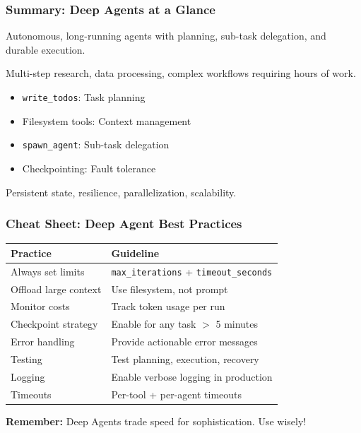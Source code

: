 \documentclass[aspectratio=169,11pt]{beamer}
\begin{document}
\begin{frame}[fragile]
\frametitle{Summary: Deep Agents at a Glance}

\begin{conceptbox}
Autonomous, long-running agents with planning, sub-task delegation, and durable execution.
\end{conceptbox}

\begin{conceptbox}
Multi-step research, data processing, complex workflows requiring hours of work.
\end{conceptbox}

\begin{conceptbox}
\begin{itemize}
    \setlength{\itemsep}{1pt}
  \item \texttt{write\_todos}: Task planning
  \item Filesystem tools: Context management
  \item \texttt{spawn\_agent}: Sub-task delegation
  \item Checkpointing: Fault tolerance
\end{itemize}
\end{conceptbox}

\begin{conceptbox}
Persistent state, resilience, parallelization, scalability.
\end{conceptbox}

\end{frame}

\begin{frame}[fragile]
\frametitle{Cheat Sheet: Deep Agent Best Practices}

\begin{center}
\small
\begin{tabular}{ll}
\toprule
\textbf{Practice} & \textbf{Guideline} \\
\midrule
Always set limits & \texttt{max\_iterations} + \texttt{timeout\_seconds} \\
Offload large context & Use filesystem, not prompt \\
Monitor costs & Track token usage per run \\
Checkpoint strategy & Enable for any task $>$ 5 minutes \\
Error handling & Provide actionable error messages \\
Testing & Test planning, execution, recovery \\
Logging & Enable verbose logging in production \\
Timeouts & Per-tool + per-agent timeouts \\
\bottomrule
\end{tabular}
\end{center}

\vspace{1em}
\textcolor{lcblue}{\textbf{Remember:}} Deep Agents trade speed for sophistication. Use wisely!

\end{frame}
\end{document}

